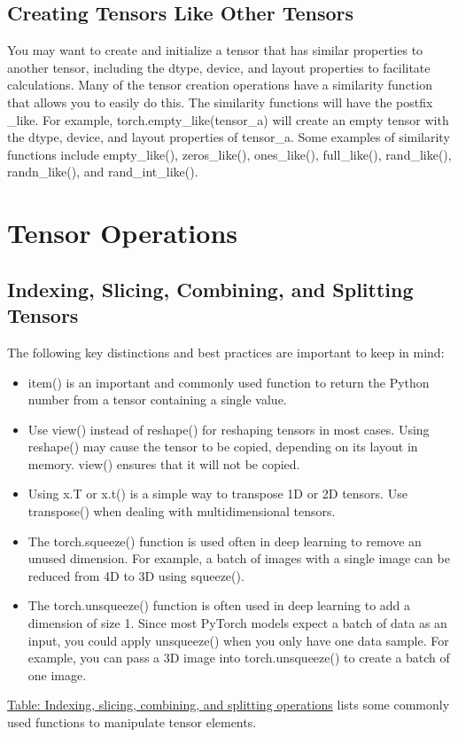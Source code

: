 \subsection{Creating Tensors Like Other Tensors}
You may want to create and initialize a tensor that has
similar properties to another tensor, including the dtype,
device, and layout properties to facilitate calculations.
Many of the tensor creation operations have a similarity function that allows you to easily do this. The similarity functions
will have the postfix \textsf{\_like}. For example, \textsf{torch.empty\_like(tensor\_a)} will create an empty tensor with the dtype, device, and
layout properties of \textsf{tensor\_a}. Some examples of similarity
functions include \textsf{empty\_like()}, \textsf{zeros\_like()}, \textsf{ones\_like()},
\textsf{full\_like()}, \textsf{rand\_like()}, \textsf{randn\_like()}, and \textsf{rand\_int\_like()}.
\section{Tensor Operations}
\subsection{Indexing, Slicing, Combining, and Splitting Tensors}
The following key distinctions and best practices are important to keep in mind:
\begin{itemize}
    \item \textsf{item()} is an important and commonly used function to return the Python number from a tensor containing a single value.
    \item Use \textsf{view()} instead of reshape() for reshaping tensors in most cases. Using reshape() may cause the tensor to be copied, depending on its layout in memory. view() ensures that it will not be copied.
    \item Using x.T or x.t() is a simple way to transpose 1D or 2D tensors. Use transpose() when dealing with multidimensional tensors.
    \item The \textsf{torch.squeeze()} function is used often in deep learning to remove an unused dimension. For example, a batch of images with a single image can be reduced from 4D to 3D using squeeze().
    \item The \textsf{torch.unsqueeze()} function is often used in deep learning to add a dimension of size 1. Since most PyTorch models expect a batch of data as an input, you could apply unsqueeze() when you only have one data sample. For example, you can pass a 3D image into torch.unsqueeze() to create a batch of one image.
\end{itemize}
\href{www}{Table: Indexing, slicing, combining, and splitting operations} lists some commonly used functions to manipulate
tensor elements.

